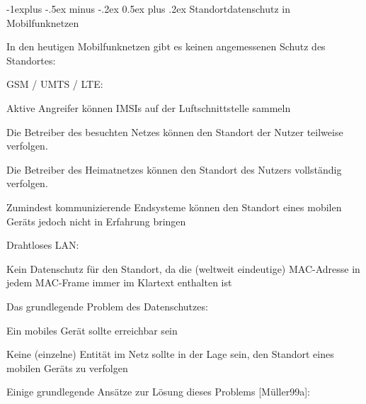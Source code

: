 \documentclass[a4paper]{article}
\makeatletter
\renewcommand{\subsection}{\@startsection{subsection}{2}{0mm}%
 {-1explus -.5ex minus -.2ex}%
 {0.5ex plus .2ex}%
 {\normalfont\normalsize\bfseries}}
\makeatother
\begin{document}
\begin{multicols}{3}
\begin{itemize*}
            \subsection{Standortdatenschutz in
                  Mobilfunknetzen}
            \begin{itemize*}
                  \item       In den heutigen Mobilfunknetzen gibt es keinen angemessenen Schutz des
                  Standortes:
                  \begin{itemize*}
                        \item GSM / UMTS / LTE:
                        \begin{itemize*} \item Aktive Angreifer können IMSIs auf der Luftschnittstelle sammeln \item Die Betreiber des besuchten Netzes können den Standort der Nutzer teilweise verfolgen. \item Die Betreiber des Heimatnetzes können den Standort des Nutzers vollständig verfolgen. \item Zumindest kommunizierende Endsysteme können den Standort eines mobilen Geräts jedoch nicht in Erfahrung bringen \end{itemize*}
                  \end{itemize*}
                  \item       Drahtloses LAN:
                  \begin{itemize*}
                        \item Kein Datenschutz für den Standort, da die (weltweit eindeutige) MAC-Adresse in jedem MAC-Frame immer im Klartext enthalten ist
                  \end{itemize*}
                  \item       Das grundlegende Problem des Datenschutzes:
                  \begin{itemize*}
                        \item Ein mobiles Gerät sollte erreichbar sein
                        \item Keine (einzelne) Entität im Netz sollte in der Lage sein, den Standort eines mobilen Geräts zu verfolgen
                  \end{itemize*}
                  \item       Einige grundlegende Ansätze zur Lösung dieses Problems
                  {[}Müller99a{]}:
                  \begin{itemize*}

\end{itemize*}
\end{itemize*}
\end{itemize*}
\end{multicols}
\end{document}
